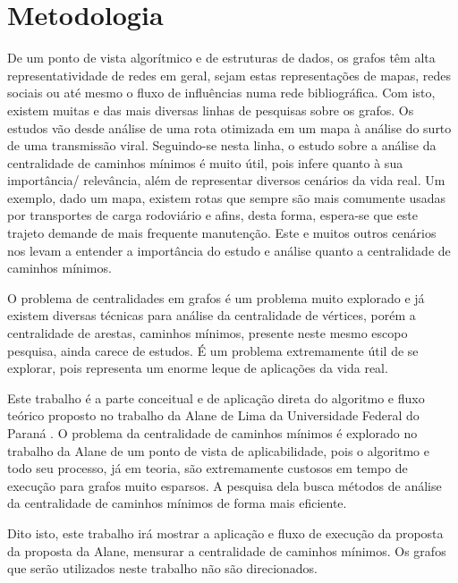 \graphicspath{{\currfiledir/images/}}

\chapter{Metodologia}


De um ponto de vista algorítmico e de estruturas de dados, os grafos têm alta representatividade de redes em geral, sejam estas representações de mapas, redes sociais ou até mesmo o fluxo de influências numa rede bibliográfica. Com isto, existem muitas e das mais diversas linhas de pesquisas sobre os grafos. Os estudos vão desde análise de uma rota otimizada em um mapa à análise do surto de uma transmissão viral. Seguindo-se nesta linha, o estudo sobre a análise da centralidade de caminhos mínimos é muito útil, pois infere quanto à sua importância/ relevância, além de representar diversos cenários da vida real. Um exemplo, dado um mapa, existem rotas que sempre são mais comumente usadas por transportes de carga rodoviário e afins, desta forma, espera-se que este trajeto demande de mais frequente manutenção. Este e muitos outros cenários nos levam a entender a importância do estudo e análise quanto a centralidade de caminhos mínimos.

O problema de centralidades em grafos é um problema muito explorado e já existem diversas técnicas para análise da centralidade de vértices, porém a centralidade de arestas, caminhos mínimos, presente neste mesmo escopo pesquisa, ainda carece de estudos. É um problema extremamente útil de se explorar, pois representa um enorme leque de aplicações da vida real.

Este trabalho é a parte conceitual e de aplicação direta do algoritmo e fluxo teórico proposto no trabalho da Alane de Lima da Universidade Federal do Paraná \cite{alane2021}. O problema da centralidade de caminhos mínimos é explorado no trabalho da Alane de um ponto de vista de aplicabilidade, pois o algoritmo e todo seu processo, já em teoria, são extremamente custosos em tempo de execução para grafos muito esparsos. A pesquisa dela busca métodos de análise da centralidade de caminhos mínimos de forma mais eficiente.

Dito isto, este trabalho irá mostrar a aplicação e fluxo de execução da proposta da proposta da Alane, mensurar a centralidade de caminhos mínimos. Os grafos que serão utilizados neste trabalho não são direcionados.

